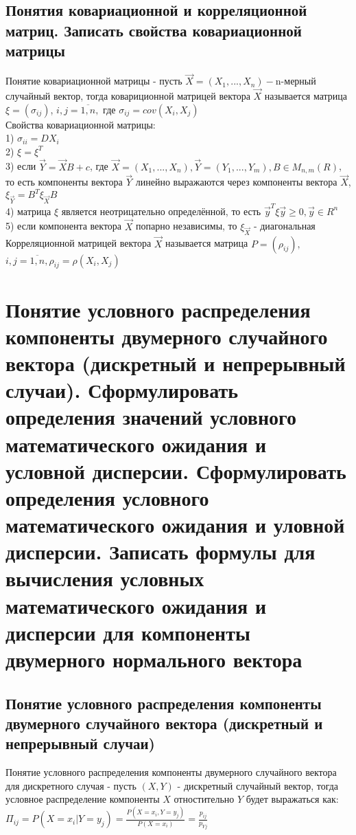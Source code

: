 \subsection{Понятия ковариационной и корреляционной матриц. Записать свойства ковариационной матрицы}
Понятие ковариационной матрицы - пусть $\overrightarrow{X} = (X_{1}, ..., X_{n}) - $n-мерный случайный вектор, тогда ковариционной матрицей вектора $\overrightarrow{X}$ называется матрица $\xi = (\sigma_{ij})$, $i,j = \overline{1, n},$ где $\sigma_{ij} = cov(X_{i}, X_{j})$\\

Свойства ковариационной матрицы:\\
1) $\sigma_{ii} = DX_{i}$\\
2) $\xi = \xi^{T}$\\
3) если $\overrightarrow{Y} = \overrightarrow{X}B + c$, где $\overrightarrow{X} = (X_{1}, ..., X_{n}), \overrightarrow{Y} = (Y_{1}, ..., Y_{m}), B \in M_{n,m}(R)$, то есть компоненты вектора $\overrightarrow{Y}$ линейно выражаются через компоненты вектора $\overrightarrow{X}$, $\xi_{\overrightarrow{Y}} = B^{T}\xi_{\overrightarrow{X}}B$\\
4) матрица $\xi$ является неотрицательно определённой, то есть $\overrightarrow{y}^{T}\xi\overrightarrow{y} \geqslant 0, \overrightarrow{y} \in R^{n}$\\
5) если компонента вектора $\overrightarrow{X}$ попарно независимы, то $\xi_{\overrightarrow{X}}$ - диагональная\\

Корреляционной матрицей вектора $\overrightarrow{X}$ называется матрица $P = (\rho_{ij}),$ $i,j = \overline{1, n}, \rho_{ij} = \rho(X_{i}, X_{j})$

\section{Понятие условного распределения компоненты двумерного случайного вектора (дискретный и непрерывный случаи). Сформулировать определения значений условного математического ожидания и условной дисперсии. Сформулировать определения условного математического ожидания и уловной дисперсии. Записать формулы для вычисления условных математического ожидания и дисперсии для компоненты двумерного нормального вектора}

\subsection{Понятие условного распределения компоненты двумерного случайного вектора (дискретный и непрерывный случаи)}
Понятие условного распределения компоненты двумерного случайного вектора для дискретного случая - пусть $(X, Y)$ - дискретный случайный вектор, тогда условное распределение компоненты $X$ отностительно $Y$ будет выражаться как: $\Pi_{ij} = P(X = x_{i} | Y = y_{j}) = \frac{P(X = x_{i}, Y  = y_{j})}{P(X = x_{i})} = \frac{p_{ij}}{p_{Yj}}$\\

